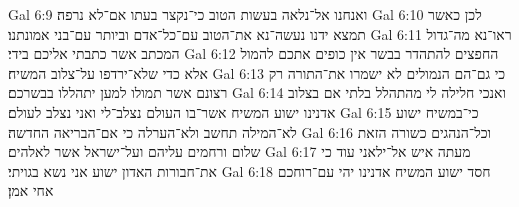 Gal 6:9  ואנחנו אל־נלאה בעשות הטוב כי־נקצר בעתו אם־לא נרפה׃
Gal 6:10  לכן כאשר תמצא ידנו נעשה־נא את־הטוב עם־כל־אדם וביותר עם־בני אמונתנו׃
Gal 6:11  ראו־נא מה־גדול המכתב אשר כתבתי אליכם בידי׃
Gal 6:12  החפצים להתהדר בבשר אין כופים אתכם להמול אלא כדי שלא־ירדפו על־צלוב המשיח׃
Gal 6:13  כי גם־הם הנמולים לא ישמרו את־התורה רק רצונם אשר תמולו למען יתהללו בבשרכם׃
Gal 6:14  ואנכי חלילה לי מהתהלל בלתי אם בצלוב אדנינו ישוע המשיח אשר־בו העולם נצלב־לי ואני נצלב לעולם׃
Gal 6:15  כי־במשיח ישוע לא־המילה תחשב ולא־הערלה כי אם־הבריאה החדשה׃
Gal 6:16  וכל־הנהגים כשורה הזאת שלום ורחמים עליהם ועל־ישראל אשר לאלהים׃
Gal 6:17  מעתה איש אל־ילאני עוד כי את־חבורות האדון ישוע אני נשא בגויתי׃
Gal 6:18  חסד ישוע המשיח אדנינו יהי עם־רוחכם אחי אמן׃


